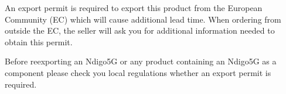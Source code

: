 An export permit is required to export this product from the European Community (EC) which will cause additional lead time. When ordering from outside the EC, the seller will ask you for additional information needed to obtain this permit.

Before reexporting an Ndigo5G or any product containing an Ndigo5G as a component please check you local regulations whether an export permit is required.